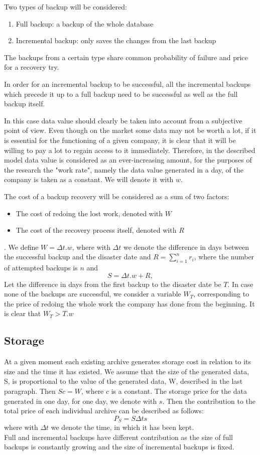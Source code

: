 \documentclass[11pt, a4paper]{article}
\theoremstyle{definition}
\begin{document}
		Two types of backup will be considered:
		\begin{enumerate}
			\item Full backup: a backup of the whole database
			\item Incremental backup: only saves the changes from the last backup
		\end{enumerate}
		The backups from a certain type share common probability of failure and price for a recovery try.\par
		In order for an incremental backup to be successful, all the incremental backups which precede it up to a full backup need to be successful as well as the full backup itself.\par
		In this case data value should clearly be taken into account from a subjective point of view. Even though on the market some data may not be worth a lot, if it is essential for the functioning of a given company, it is clear that it will be willing to pay a lot to regain access to it immediately. Therefore, in the described model data value is considered as an ever-increasing amount, for the purposes of the research the "work rate", namely the data value generated in a day, of the company is taken as a constant. We will denote it with $w$.\par
		The cost of a backup recovery will be considered as a sum of two factors:
		\begin{itemize}
			\item The cost of redoing the lost work, denoted with $W$
			\item The cost of the recovery process itself, denoted with $R$
		\end{itemize}.
		We define $W = \Delta t.w$, where with $\Delta t$ we denote the difference in days between the successful backup and the disaster date and $R = \sum_{i=1}^{n} r_i$, where the number of attempted backups is $n$ and 
		$$
		S=\Delta t.w + R,
		$$
		Let the difference in days from the first backup to the disaster date be $T$. In case none of the backups are successful, we consider a variable $W_T$, corresponding to the price of redoing the whole work the company has done from the beginning. It is clear that $W_T>T.w$\par
\newpage
		\subsection{Storage}
		At a given moment each existing archive generates storage cost in relation to its size and the time it has existed. We assume that the size of the generated data, S, is proportional to the value of the generated data, W, described in the last paragraph. Then $Sc = W$, where $c$ is a constant. The storage price for the data generated in one day, for one day, we denote with $s$. Then the contribution to the total price of each individual archive can be described as follows:
		\begin{equation*}
			P_S = S\Delta ts
		\end{equation*}
		where with $\Delta t$ we denote the time, in which it has been kept.\\
		Full and incremental backups have different contribution as the size of full backups is constantly growing and the size of incremental backups is fixed.
\end{document}

